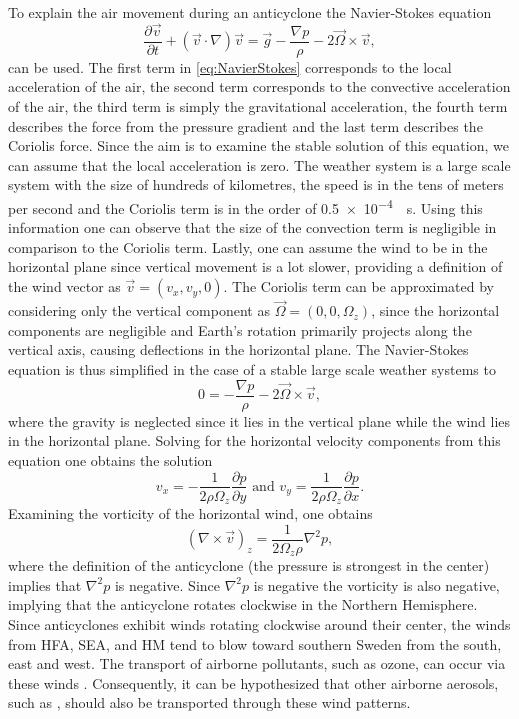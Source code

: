 To explain the air movement during an anticyclone the Navier-Stokes equation
\begin{equation} \frac{\partial \vec{v}}{\partial t} + (\vec{v} \cdot \nabla)\vec{v} = \vec{g} - \frac{\nabla p}{\rho} - 2\vec{\Omega} \times \vec{v}, \label{eq:NavierStokes} \end{equation}
can be used. The first term in \autoref{eq:NavierStokes} corresponds to the local acceleration of the air, the second term corresponds to the convective acceleration of the air, the third term is simply the gravitational acceleration, the fourth term describes the force from the pressure gradient and the last term describes the Coriolis force. Since the aim is to examine the stable solution of this equation, we can assume that the local acceleration is zero. The weather system is a large scale system with the size of hundreds of kilometres, the speed is in the tens of meters per second and the Coriolis term is in the order of \SI{0.5e-4}{\per\s}. Using this information one can observe that the size of the convection term is negligible in comparison to the Coriolis term. Lastly, one can assume the wind to be in the horizontal plane since vertical movement is a lot slower, providing a definition of the wind vector as $\vec{v}=(v_x,v_y,0)$. The Coriolis term can be approximated by considering only the vertical component as $\vec{\Omega}=(0,0,\Omega_z)$, since the horizontal components are negligible and Earth's rotation primarily projects along the vertical axis, causing deflections in the horizontal plane. The Navier-Stokes equation is thus simplified in the case of a stable large scale weather systems to
\begin{equation} 0 = - \frac{\nabla p}{\rho} - 2{\vec{\Omega}} \times \vec{v}, \label{eq:NavierStokes2} \end{equation}
where the gravity is neglected since it lies in the vertical plane while the wind lies in the horizontal plane. Solving for the horizontal velocity components from this equation one obtains the solution
\begin{equation} v_x=-\frac{1}{2\rho\Omega_z}\frac{\partial p}{\partial y}\text{ and }v_y=\frac{1}{2\rho\Omega_z}\frac{\partial p}{\partial x}. 
\end{equation}
Examining the vorticity of the horizontal wind, one obtains  
\begin{equation}
    (\nabla \times \vec{v})_z  = \frac{1}{2\Omega_z\rho}\nabla^2p,
\end{equation} 
where the definition of the anticyclone (the pressure is strongest in the center) implies that $\nabla^2p$ is negative. Since $\nabla^2p$ is negative the vorticity is also negative, implying that the anticyclone rotates clockwise in the Northern Hemisphere. Since anticyclones exhibit winds rotating clockwise around their center, the winds from HFA, SEA, and HM tend to blow toward southern Sweden from the south, east and west. The transport of airborne pollutants, such as ozone, can occur via these winds \cite{oteroImpactAtmosphericBlocking2022}. Consequently, it can be hypothesized that other airborne aerosols, such as \PM, should also be transported through these wind patterns.


